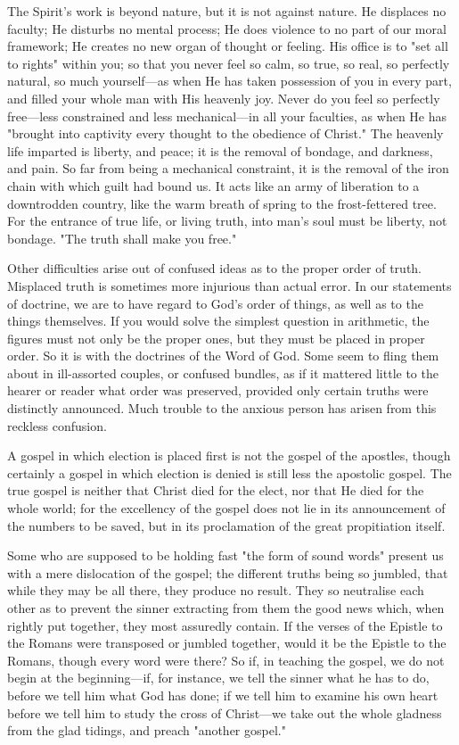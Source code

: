 \documentclass[
]{book}
\begin{document}
The Spirit's work is beyond nature, but it is not against nature. He displaces no faculty; He disturbs no mental process; He does violence to no part of our moral framework; He creates no new organ of thought or feeling. His office is to "set all to rights" within you; so that you never feel so calm, so true, so real, so perfectly natural, so much yourself---as when He has taken possession of you in every part, and filled your whole man with His heavenly joy. Never do you feel so perfectly free---less constrained and less mechanical---in all your faculties, as when He has "brought into captivity every thought to the obedience of Christ." The heavenly life imparted is liberty, and peace; it is the removal of bondage, and darkness, and pain. So far from being a mechanical constraint, it is the removal of the iron chain with which guilt had bound us. It acts like an army of liberation to a downtrodden country, like the warm breath of spring to the frost-fettered tree. For the entrance of true life, or living truth, into man's soul must be liberty, not bondage. "The truth shall make you free."

Other difficulties arise out of confused ideas as to the proper order of truth. Misplaced truth is sometimes more injurious than actual error. In our statements of doctrine, we are to have regard to God's order of things, as well as to the things themselves. If you would solve the simplest question in arithmetic, the figures must not only be the proper ones, but they must be placed in proper order. So it is with the doctrines of the Word of God. Some seem to fling them about in ill-assorted couples, or confused bundles, as if it mattered little to the hearer or reader what order was preserved, provided only certain truths were distinctly announced. Much trouble to the anxious person has arisen from this reckless confusion.

A gospel in which election is placed first is not the gospel of the apostles, though certainly a gospel in which election is denied is still less the apostolic gospel. The true gospel is neither that Christ died for the elect, nor that He died for the whole world; for the excellency of the gospel does not lie in its announcement of the numbers to be saved, but in its proclamation of the great propitiation itself.

Some who are supposed to be holding fast "the form of sound words" present us with a mere dislocation of the gospel; the different truths being so jumbled, that while they may be all there, they produce no result. They so neutralise each other as to prevent the sinner extracting from them the good news which, when rightly put together, they most assuredly contain. If the verses of the Epistle to the Romans were transposed or jumbled together, would it be the Epistle to the Romans, though every word were there? So if, in teaching the gospel, we do not begin at the beginning---if, for instance, we tell the sinner what he has to do, before we tell him what God has done; if we tell him to examine his own heart before we tell him to study the cross of Christ---we take out the whole gladness from the glad tidings, and preach "another gospel."
\end{document}
